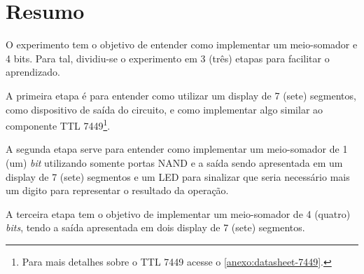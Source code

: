 \chapter{Resumo}

O experimento tem o objetivo de entender como implementar um meio-somador e 4 bits. Para tal, dividiu-se
o experimento em 3 (três) etapas para facilitar o aprendizado.

A primeira etapa é para entender como utilizar um display de 7 (sete) segmentos, como dispositivo
de saída do circuito, e como
implementar algo similar ao componente TTL 7449\footnote{Para mais detalhes sobre o TTL 7449 acesse o \autoref{anexo:datasheet-7449}.}.

A segunda etapa serve para entender como implementar um meio-somador de 1 (um) \textit{bit} utilizando
somente portas NAND e a saída sendo apresentada em um display de 7 (sete) segmentos e um LED para
sinalizar que seria necessário mais um digito para representar o resultado da operação.

A terceira etapa tem o objetivo de implementar um meio-somador de 4 (quatro) \textit{bits}, tendo
 a saída apresentada em dois display de 7 (sete) segmentos.


